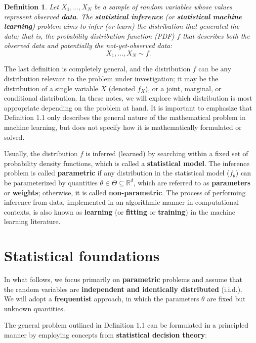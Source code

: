 \documentclass{report}
\newtheorem{definition}{Definition}[chapter]
\begin{document}
\begin{definition}
Let $X_1,\dots,X_N$ be a sample of random variables whose values represent observed \textbf{data}. The \textbf{statistical inference} (or \textbf{statistical machine learning}) problem aims to infer (or learn) the distribution that generated the data; that is, the probability distribution function (PDF) $f$ that describes both the observed data and potentially the not-yet-observed data:
\begin{equation}
X_1,\dots,X_N \sim f.
\end{equation}
\end{definition}

The last definition is completely general, and the distribution $f$ can be any distribution relevant to the problem under investigation; it may be the distribution of a single variable $X$ (denoted $f_X$), or a joint, marginal, or conditional distribution. In these notes, we will explore which distribution is most appropriate depending on the problem at hand. It is important to emphasize that Definition 1.1 only describes the general nature of the mathematical problem in machine learning, but does not specify how it is mathematically formulated or solved.

Usually, the distribution $f$ is inferred (learned) by searching within a fixed set of probability density functions, which is called a \textbf{statistical model}. The inference problem is called \textbf{parametric} if any distribution in the statistical model ($f_\theta$) can be parameterized by quantities $\theta \in \Theta \subseteq \mathbb{R}^d$, which are referred to as \textbf{parameters} or \textbf{weights}; otherwise, it is called \textbf{non-parametric}. The process of performing inference from data, implemented in an algorithmic manner in computational contexts, is also known as \textbf{learning} (or \textbf{fitting} or \textbf{training}) in the machine learning literature.

\section{Statistical foundations}
In what follows, we focus primarily on \textbf{parametric} problems and assume that the random variables are \textbf{independent and identically distributed} (i.i.d.). We will adopt a \textbf{frequentist} approach, in which the parameters $\theta$ are fixed but unknown quantities.

The general problem outlined in Definition 1.1 can be formulated in a principled manner by employing concepts from \textbf{statistical decision theory}:
\end{document}
